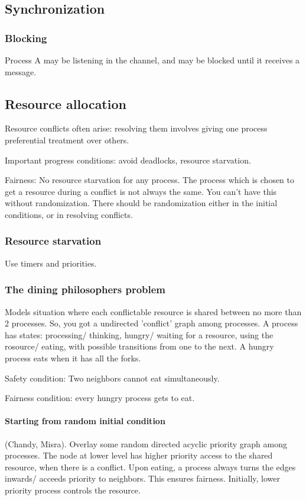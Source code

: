 \documentclass[oneside, article]{memoir}
\begin{document}
\subsection{Synchronization}
\subsubsection{Blocking}
Process A may be listening in the channel, and may be blocked until it receives a message.

\subsection{Resource allocation}
Resource conflicts often arise: resolving them involves giving one process preferential treatment over others.

Important progress conditions: avoid deadlocks, resource starvation.

Fairness: No resource starvation for any process. The process which is chosen to get a resource during a conflict is not always the same. You can't have this without randomization. There should be randomization either in the initial conditions, or in resolving conflicts.

\subsubsection{Resource starvation}
Use timers and priorities.

\subsubsection{The dining philosophers problem}
Models situation where each conflictable resource is shared between no more than 2 processes. So, you got a undirected 'conflict' graph among processes. A process has states: processing/ thinking, hungry/ waiting for a resource, using the rosource/ eating, with possible transitions from one to the next. A hungry process eats when it has all the forks.

Safety condition: Two neighbors cannot eat simultaneously.

Fairness condition: every hungry process gets to eat.

\paragraph*{Starting from random initial condition}
(Chandy, Misra). Overlay some random directed acyclic priority graph among processes. The node at lower level has higher priority access to the shared resource, when there is a conflict. Upon eating, a process always turns the edges inwards/ acceeds priority to neighbors. This ensures fairness. Initially, lower priority process controls the resource.
\end{document}
